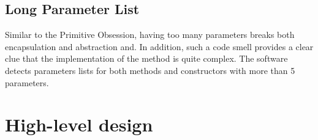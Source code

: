 \documentclass[a4paper]{article}
\begin{document}
\subsection{Long Parameter List}
Similar to the Primitive Obsession, having too many parameters breaks both
encapsulation and abstraction and.
In addition, such a code smell provides a clear clue that the implementation
of the method is quite complex.
The software detects parameters lists for both methods and constructors
with more than 5 parameters.


\section{High-level design}


\end{document}

